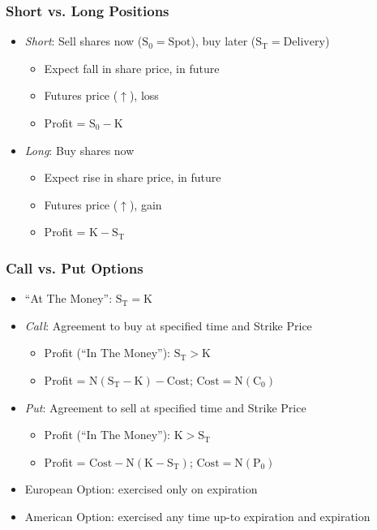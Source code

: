 \documentclass[11pt, english]{article}
\begin{document}
		\subsubsection{Short vs. Long Positions}

	\begin{itemize}                                       
        \setlength\itemsep{0cm}
		\item \textit{Short}: Sell shares now ($\mathrm{S_0=Spot}$), buy later ($\mathrm{S_T=Delivery}$)
		\begin{itemize}
			\item Expect fall in share price, in future
			\item Futures price ($\uparrow$), loss
			\item Profit = $\mathrm{S_0-K}$
		\end{itemize}
		\item \textit{Long}: Buy shares now
		\begin{itemize}
			\item Expect rise in share price, in future
			\item Futures price ($\uparrow$), gain
			\item Profit = $\mathrm{K-S_T}$
		\end{itemize}
	\end{itemize}

		\subsubsection{Call vs. Put Options}

	\begin{itemize}
	\setlength\itemsep{0cm}
		\item ``At The Money'': $\mathrm{S_T=K}$
		\item \textit{Call}: Agreement to buy at specified time and Strike Price
		\begin{itemize}
			\item Profit (``In The Money''): $\mathrm{S_T>K}$
			\item Profit = $\mathrm{N(S_T-K)-Cost}$; $\mathrm{Cost=N(C_0)}$
		\end{itemize}
		\item \textit{Put}: Agreement to sell at specified time and Strike Price
		\begin{itemize} 
			\item Profit (``In The Money''): $\mathrm{K>S_T}$
			\item Profit = $\mathrm{Cost-N(K-S_T)}$; $\mathrm{Cost=N(P_0)}$
		\end{itemize}
		\item European Option: exercised only on expiration
		\item American Option: exercised any time up-to expiration and expiration
	\end{itemize}
\end{document}

